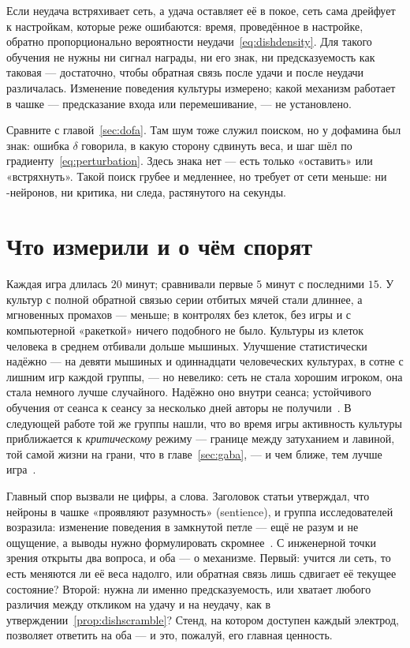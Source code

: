 \begin{keyblock}
\begin{proposition}
\label{prop:dishscramble}
Если неудача встряхивает сеть, а удача оставляет её в покое, сеть сама дрейфует к настройкам, которые реже ошибаются: время, проведённое в настройке, обратно пропорционально вероятности неудачи~\eqref{eq:dishdensity}. Для такого обучения не нужны ни сигнал награды, ни его знак, ни предсказуемость как таковая --- достаточно, чтобы обратная связь после удачи и после неудачи различалась. Изменение поведения культуры измерено; какой механизм работает в чашке --- предсказание входа или перемешивание, --- не установлено.
\end{proposition}
\end{keyblock}

Сравните с главой~\ref{sec:dofa}. Там шум тоже служил поиском, но у дофамина был знак: ошибка $\delta$ говорила, в какую сторону сдвинуть веса, и шаг шёл по градиенту~\eqref{eq:perturbation}. Здесь знака нет --- есть только «оставить» или «встряхнуть». Такой поиск грубее и медленнее, но требует от сети меньше: ни -нейронов, ни критика, ни следа, растянутого на секунды.

\section{Что измерили и о чём спорят}

Каждая игра длилась $20$ минут; сравнивали первые $5$ минут с последними $15$. У культур с полной обратной связью серии отбитых мячей стали длиннее, а мгновенных промахов --- меньше; в контролях без клеток, без игры и с компьютерной «ракеткой» ничего подобного не было. Культуры из клеток человека в среднем отбивали дольше мышиных. Улучшение статистически надёжно --- на девяти мышиных и одиннадцати человеческих культурах, в сотне с лишним игр каждой группы, --- но невелико: сеть не стала хорошим игроком, она стала немного лучше случайного. Надёжно оно внутри сеанса; устойчивого обучения от сеанса к сеансу за несколько дней авторы не получили~\cite{Kagan2022}. В следующей работе той же группы нашли, что во время игры активность культуры приближается к \emph{критическому} режиму --- границе между затуханием и лавиной, той самой жизни на грани, что в главе~\ref{sec:gaba}, --- и чем ближе, тем лучше игра~\cite{Habibollahi2023}.

Главный спор вызвали не цифры, а слова. Заголовок статьи утверждал, что нейроны в чашке «проявляют разумность» (sentience), и группа исследователей возразила: изменение поведения в замкнутой петле --- ещё не разум и не ощущение, а выводы нужно формулировать скромнее~\cite{Balci2023}. С инженерной точки зрения открыты два вопроса, и оба --- о механизме. Первый: учится ли сеть, то есть меняются ли её веса надолго, или обратная связь лишь сдвигает её текущее состояние? Второй: нужна ли именно предсказуемость, или хватает любого различия между откликом на удачу и на неудачу, как в утверждении~\ref{prop:dishscramble}? Стенд, на котором доступен каждый электрод, позволяет ответить на оба --- и это, пожалуй, его главная ценность.

